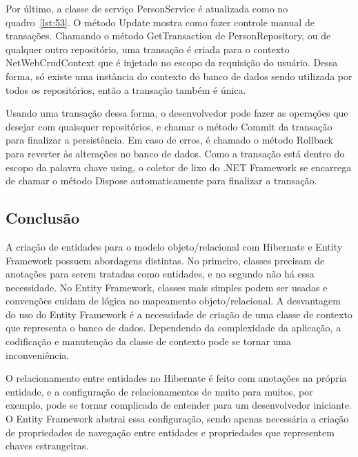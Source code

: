 \documentclass[a4paper,12pt]{article}
\newcommand{\sharpcode}[3] {
	
}
\begin{document}
\sharpcode{code/52.txt}{Configuração de injeção de repositórios no projeto ASP.NET MVC}{lst:52}

Por último, a classe de serviço PersonService é atualizada como no quadro~\ref{lst:53}. O método Update mostra como fazer controle manual de transações. Chamando o método GetTransaction de PersonRepository, ou de qualquer outro repositório, uma transação é criada para o contexto NetWebCrudContext que é injetado no escopo da requisição do usuário. Dessa forma, só existe uma instância do contexto do banco de dados sendo utilizada por todos os repositórios, então a transação também é única.

Usando uma transação dessa forma, o desenvolvedor pode fazer as operações que desejar com quaisquer repositórios, e chamar o método Commit da transação para finalizar a persistência. Em caso de erros, é chamado o método Rollback para reverter às alterações no banco de dados. Como a transação está dentro do escopo da palavra chave using, o coletor de lixo do .NET Framework se encarrega de chamar o método Dispose automaticamente para finalizar a transação.

\sharpcode{code/53.txt}{Classe PersonService utilizando ambos os repositórios no projeto ASP.NET MVC}{lst:53}

\subsection{Conclusão}

A criação de entidades para o modelo objeto/relacional com Hibernate e Entity Framework possuem abordagens distintas. No primeiro, classes precisam de anotações para serem tratadas como entidades, e no segundo não há essa necessidade. No Entity Framework, classes mais simples podem ser usadas e convenções cuidam de lógica no mapeamento objeto/relacional. A desvantagem do uso do Entity Framework é a necessidade de criação de uma classe de contexto que representa o banco de dados. Dependendo da complexidade da aplicação, a codificação e manutenção da classe de contexto pode se tornar uma inconveniência.

O relacionamento entre entidades no Hibernate é feito com anotações na própria entidade, e a configuração de relacionamentos de muito para muitos, por exemplo, pode se tornar complicada de entender para um desenvolvedor iniciante. O Entity Framework abstrai essa configuração, sendo apenas necessária a criação de propriedades de navegação entre entidades e propriedades que representem chaves estrangeiras.
\end{document}
